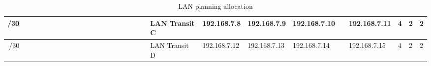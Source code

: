 \documentclass[11pt,a4paper]{report}
\begin{document}
\begin{table}[]
\begin{tabular}{rlllllllllllllllllllllllllll}
/30                  &                      & \cellcolor[HTML]{FFFFFF} & \cellcolor[HTML]{FFFFFF} & \cellcolor[HTML]{9698ED} & \cellcolor[HTML]{9698ED} &                          &                          &                          &                          &                          &                          &                          &                          &                          &                          &                          &                          &  & LAN Transit C    & 192.168.7.8   & 192.168.7.9     & 192.168.7.10   &               & 192.168.7.11  & 4        & 2       & 2         \\ \hline
/30                  &                      & \cellcolor[HTML]{9698ED} & \cellcolor[HTML]{9698ED} &                          &                          &                          &                          &                          &                          &                          &                          &                          &                          &                          &                          &                          &                          &  & LAN Transit D    & 192.168.7.12  & 192.168.7.13    & 192.168.7.14   &               & 192.168.7.15  & 4        & 2       & 2         \\ \hline
\end{tabular}
\caption{LAN planning allocation}
\label{tab:lanalloc}
\end{table}
\end{document}
